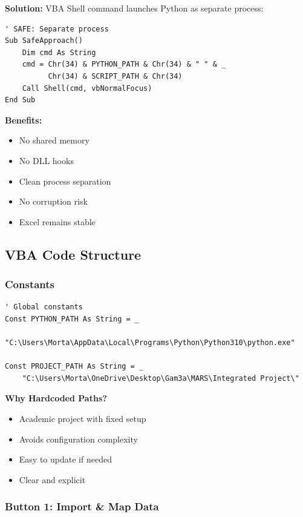 \textbf{Solution:} VBA Shell command launches Python as separate process:

\begin{lstlisting}[style=vbastyle]
' SAFE: Separate process
Sub SafeApproach()
    Dim cmd As String
    cmd = Chr(34) & PYTHON_PATH & Chr(34) & " " & _
          Chr(34) & SCRIPT_PATH & Chr(34)
    Call Shell(cmd, vbNormalFocus)
End Sub
\end{lstlisting}

\textbf{Benefits:}
\begin{itemize}
    \item No shared memory
    \item No DLL hooks
    \item Clean process separation
    \item No corruption risk
    \item Excel remains stable
\end{itemize}

\subsection{VBA Code Structure}

\subsubsection{Constants}

\begin{lstlisting}[style=vbastyle, caption=Path Configuration]
' Global constants
Const PYTHON_PATH As String = _
    "C:\Users\Morta\AppData\Local\Programs\Python\Python310\python.exe"
    
Const PROJECT_PATH As String = _
    "C:\Users\Morta\OneDrive\Desktop\Gam3a\MARS\Integrated Project\"
\end{lstlisting}

\textbf{Why Hardcoded Paths?}
\begin{itemize}
    \item Academic project with fixed setup
    \item Avoids configuration complexity
    \item Easy to update if needed
    \item Clear and explicit
\end{itemize}

\subsubsection{Button 1: Import \& Map Data}

